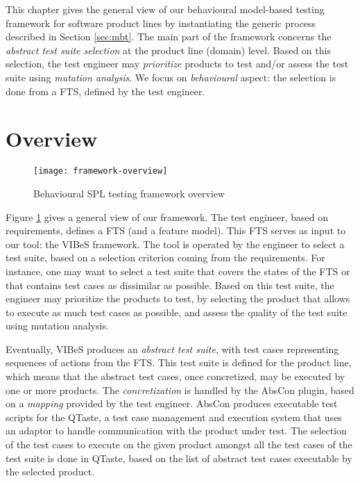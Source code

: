 
This chapter gives the general view of our behavioural model-based testing framework for software product lines \cite{Devroey2012} by instantiating the generic process described in Section \ref{sec:mbt}.
The main part of the framework concerns the \emph{abstract test suite selection} at the product line (domain) level. Based on this selection, the test engineer may \emph{prioritize} products to test and/or assess the test suite using \emph{mutation analysis}. We focus on \emph{behavioural} aspect: the selection is done from a \gls{FTS}, defined by the test engineer. 


\section{Overview}

\begin{figure}[t]
	\centering
	\texttt{[image: framework-overview]}
	\caption{Behavioural SPL testing framework overview}
	\label{fig:frameworkoverview}
\end{figure}


Figure \ref{fig:frameworkoverview} gives a general view of our framework. The test engineer, based on requirements, defines a FTS (and a feature model). This FTS serves as input to our tool: the \gls{VIBeS} framework. The tool is operated by the engineer to select a test suite, based on a selection criterion coming from the requirements. For instance, one may want to select a test suite that covers the states of the FTS or that contains test cases as dissimilar as possible. Based on this test suite, the engineer may prioritize the products to test, \eg by selecting the product that allows to execute as much test cases as possible, and assess the quality of the test suite using mutation analysis. 

 

Eventually, \gls{VIBeS} produces an \emph{abstract test suite}, with test cases representing sequences of actions from the FTS. This test suite is defined for the product line, which means that the abstract test cases, once concretized, may be executed by one or more products. The \emph{\gls{concretization}} is handled by the \gls{AbsCon} plugin, based on a \emph{mapping} provided by the test engineer. \gls{AbsCon} produces executable test scripts for the \gls{QTaste}, a test case management and execution system that uses an adaptor to handle communication with the product under test. The selection of the test cases to execute on the given product amongst all the test cases of the test suite is done in \gls{QTaste}, based on the list of abstract test cases executable by the selected product.

